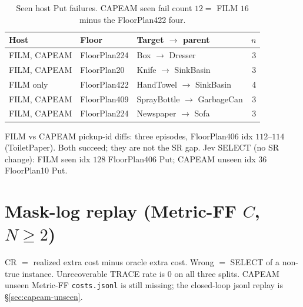\documentclass[11pt]{article}
\begin{document}
\begin{table}[t]
\centering
\caption{Seen host Put failures. CAPEAM seen fail count $12=$ FILM $16$ minus the FloorPlan422 four.}
\label{tab:seen-fail}
\scriptsize
\begin{tabular}{lllr}
\toprule
Host & Floor & Target $\to$ parent & $n$ \\
\midrule
FILM, CAPEAM & FloorPlan224 & Box $\to$ Dresser & 3 \\
FILM, CAPEAM & FloorPlan20 & Knife $\to$ SinkBasin & 3 \\
FILM only & FloorPlan422 & HandTowel $\to$ SinkBasin & 4 \\
FILM, CAPEAM & FloorPlan409 & SprayBottle $\to$ GarbageCan & 3 \\
FILM, CAPEAM & FloorPlan224 & Newspaper $\to$ Sofa & 3 \\
\bottomrule
\end{tabular}
\end{table}

FILM vs CAPEAM pickup-id diffs: three episodes, FloorPlan406 idx $112$--$114$ (ToiletPaper). Both succeed; they are not the SR gap.
Jev SELECT (no SR change): FILM seen idx $128$ FloorPlan406 Put; CAPEAM unseen idx $36$ FloorPlan10 Put.

\section{Mask-log replay (Metric-FF $C$, $N\ge 2$)}
\label{sec:replay}

CR $=$ realized extra cost minus oracle extra cost. Wrong $=$ SELECT of a non-true instance. Unrecoverable TRACE rate is $0$ on all three splits. CAPEAM unseen Metric-FF \texttt{costs.jsonl} is still missing; the closed-loop jsonl replay is \S\ref{sec:capeam-unseen}.
\end{document}
